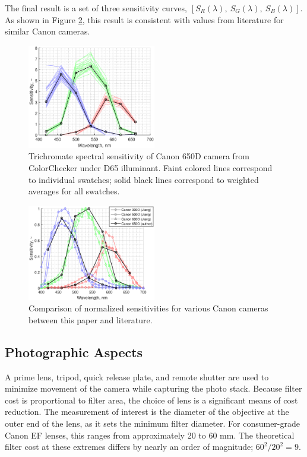 \documentclass[twocolumn,10pt]{asme2ej}
\newcommand{\id}{\hspace{6 mm}}
\begin{document}
\id The final result is a set of three sensitivity curves, $\left[ S_R(\lambda), \ S_G(\lambda), \ S_B(\lambda) \right]$. As shown in Figure \ref{camera_spectral_sensitivities}, this result is consistent with values from literature for similar Canon cameras. \cite{Jiang}

\begin{figure}
\centering
\includegraphics[width=0.5\textwidth]{canon_650d_sensitivity.eps}
\caption{Trichromate spectral sensitivity of Canon 650D camera from ColorChecker under D65 illuminant. Faint colored lines correspond to individual swatches; solid black lines correspond to weighted averages for all swatches.}
\label{canon_650d_sensitivity}
\end{figure}

\begin{figure}
\centering
\includegraphics[width=0.5\textwidth]{camera_spectral_sensitivities.eps}
\caption{Comparison of normalized sensitivities for various Canon cameras between this paper and literature. \cite{Jiang}}
\label{camera_spectral_sensitivities}
\end{figure}

\subsection{Photographic Aspects}
\label{photographic}

A prime lens, tripod, quick release plate, and remote shutter are used to minimize movement of the camera while capturing the photo stack. Because filter cost is proportional to filter area, the choice of lens is a significant means of cost reduction. The measurement of interest is the diameter of the objective at the outer end of the lens, as it sets the minimum filter diameter. For consumer-grade Canon EF lenses, this ranges from approximately 20 to 60 mm. The theoretical filter cost at these extremes differs by nearly an order of magnitude; $60^2 / 20^2 = 9$.
\end{document}
